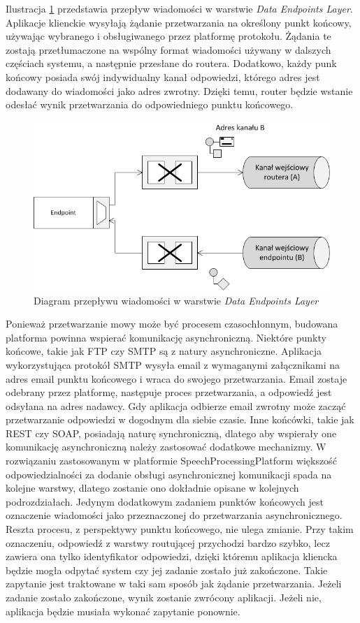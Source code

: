 Ilustracja \ref{fig:endpoins_layer_project} przedstawia przepływ wiadomości w warstwie \textit{Data Endpoints Layer}. Aplikacje klienckie wysyłają żądanie przetwarzania na określony punkt końcowy, używając wybranego i obsługiwanego przez platformę protokołu. Żądania te zostają przetłumaczone na wspólny format wiadomości używany w dalszych częściach systemu, a następnie przesłane do routera. Dodatkowo, każdy punk końcowy posiada swój indywidualny kanał odpowiedzi, którego adres jest dodawany do wiadomości jako adres zwrotny. Dzięki temu, router będzie wstanie odesłać wynik przetwarzania do odpowiedniego punktu końcowego.

\begin{figure}[!h]
	\centering
	\includegraphics[scale=0.8]{endpoints_layer_flow.png}
	\caption{Diagram przepływu wiadomości w warstwie \textit{Data Endpoints Layer}}\label{fig:endpoins_layer_project}
\end{figure}

Ponieważ przetwarzanie mowy może być procesem czasochłonnym, budowana platforma powinna wspierać komunikację asynchroniczną. Niektóre punkty końcowe, takie jak FTP czy SMTP są z natury asynchroniczne. Aplikacja wykorzystująca protokół SMTP wysyła email z wymaganymi załącznikami na adres email punktu końcowego i wraca do swojego przetwarzania. Email zostaje odebrany przez platformę, następuje proces przetwarzania, a odpowiedź jest odsyłana na adres nadawcy. Gdy aplikacja odbierze email zwrotny może zacząć przetwarzanie odpowiedzi w dogodnym dla siebie czasie. Inne końcówki, takie jak REST czy SOAP, posiadają naturę synchroniczną, dlatego aby wspierały one komunikację asynchroniczną należy zastosować dodatkowe mechanizmy. W rozwiązaniu zastosowanym w platformie SpeechProcessingPlatform większość odpowiedzialności za dodanie obsługi asynchronicznej komunikacji spada na kolejne warstwy, dlatego zostanie ono dokładnie opisane w kolejnych podrozdziałach. Jedynym dodatkowym zadaniem punktów końcowych jest oznaczenie wiadomości jako przeznaczonej do przetwarzania asynchronicznego. Reszta procesu, z perspektywy punktu końcowego, nie ulega zmianie. Przy takim oznaczeniu, odpowiedź z warstwy routującej przychodzi bardzo szybko, lecz zawiera ona tylko identyfikator odpowiedzi, dzięki któremu aplikacja kliencka będzie mogła odpytać system czy jej zadanie zostało już zakończone. Takie zapytanie jest traktowane w taki sam sposób jak żądanie przetwarzania. Jeżeli zadanie zostało zakończone, wynik zostanie zwrócony aplikacji. Jeżeli nie, aplikacja będzie musiała wykonać zapytanie ponownie.

